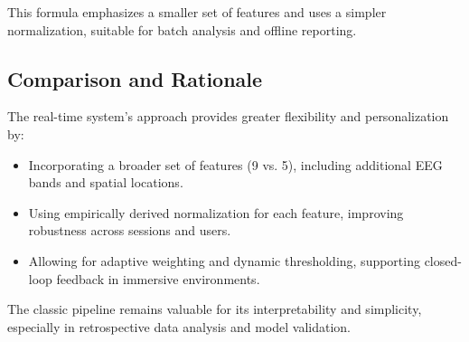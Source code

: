 This formula emphasizes a smaller set of features and uses a simpler normalization, suitable for batch analysis and offline reporting.

\subsection*{Comparison and Rationale}
The real-time system's approach provides greater flexibility and personalization by:
\begin{itemize}
    \item Incorporating a broader set of features (9 vs. 5), including additional EEG bands and spatial locations.
    \item Using empirically derived normalization for each feature, improving robustness across sessions and users.
    \item Allowing for adaptive weighting and dynamic thresholding, supporting closed-loop feedback in immersive environments.
\end{itemize}

The classic pipeline remains valuable for its interpretability and simplicity, especially in retrospective data analysis and model validation.
